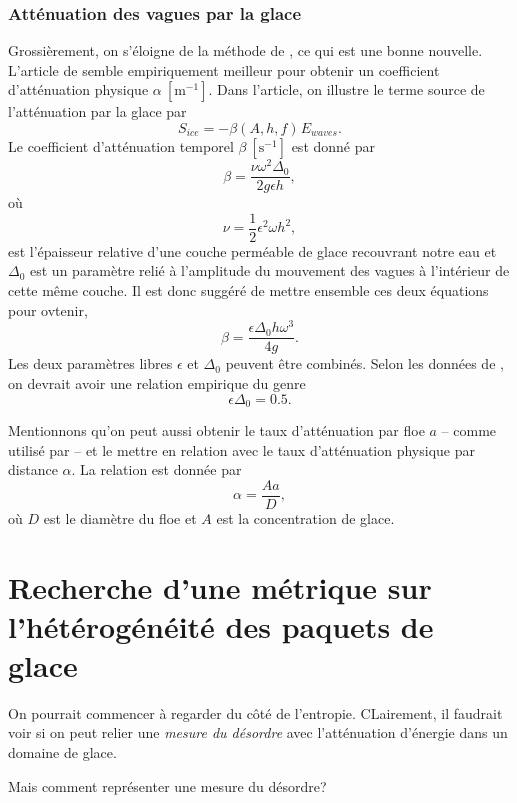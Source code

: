 \documentclass[10pt]{article}
\numberwithin{equation}{section}
\newcommand{\pt}{\hspace{1pt}} %
\begin{document}
\subsubsection{Atténuation des vagues par la glace}
\label{sec:orgc36c9b6}
Grossièrement, on s'éloigne de la méthode de \Textcite{Kohout2011wave}, ce qui est une bonne nouvelle.
L'article de \Textcite{sutherland2019two} semble empiriquement meilleur pour obtenir un coefficient d'atténuation physique \(\alpha\ [\mathrm{m}^{-1}]\).
Dans l'article, on illustre le terme source de l'atténuation par la glace par
\begin{equation}
   S_{ice} = - \beta(A,h,f)\pt E_{waves}.
\end{equation}
Le coefficient d'atténuation temporel \(\beta\ [\mathrm{s}^{-1}]\) est donné par 
\begin{equation}
   \beta = \frac{\nu \omega^2 \Delta_0}{2g\epsilon h},
\end{equation}
où
\begin{equation}
   \nu = \frac{1}{2} \epsilon^2 \omega h^2,
\end{equation}
est l'épaisseur relative d'une couche perméable de glace recouvrant notre eau et \(\Delta_0\) est un paramètre relié à l'amplitude du mouvement des vagues à l'intérieur de cette même couche.
Il est donc suggéré de mettre ensemble ces deux équations pour ovtenir,
\begin{equation}
   \beta = \frac{\epsilon \Delta_0 h \omega^3}{4g}.
\end{equation}
Les deux paramètres libres \(\epsilon\) et \(\Delta_0\) peuvent être combinés.
Selon les données de \Textcite{sutherland2019two}, on devrait avoir une relation empirique du genre
\begin{equation}
   \epsilon \Delta_0 = 0.5.
\end{equation}

Mentionnons qu'on peut aussi obtenir le taux d'atténuation par floe \(a\) -- comme utilisé par \Textcite{Kohout2011wave} -- et le mettre en relation avec le taux d'atténuation physique par distance \(\alpha\). 
La relation est donnée par
\begin{equation}
   \alpha = \frac{A a}{D},
\end{equation}
où \(D\) est le diamètre du floe et \(A\) est la concentration de glace.
\section{Recherche d'une métrique sur l'hétérogénéité des paquets de glace}
\label{sec:org2423729}

On pourrait commencer à regarder du côté de l'entropie.
CLairement, il faudrait voir si on peut relier une \emph{mesure du désordre} avec l'atténuation d'énergie dans un domaine de glace.

Mais comment représenter une mesure du désordre?











\printbibliography
\end{document}
